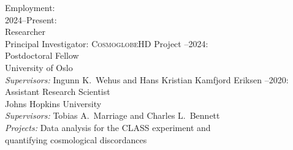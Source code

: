 \documentclass[a4paper]{resume}
\author{Duncan Joseph Watts}
\begin{document}
\maketitle




\begin{category}{Employment:}
\citemnobullet\\
2024--Present:\\
Researcher\\
Principal Investigator: \textsc{CosmoglobeHD} Project
--2024:\\
Postdoctoral Fellow\\
University of Oslo\\
\qquad \textsl{Supervisors:} Ingunn K.~Wehus and Hans Kristian Kamfjord
    Eriksen
--2020:\\
Assistant Research Scientist\\
Johns Hopkins University\\
\qquad \textsl{Supervisors:} Tobias A.~Marriage and Charles
L.~Bennett\\
\qquad \textsl{Projects:} Data analysis for the CLASS experiment and\\
\qquad {} quantifying cosmological discordances
\end{category}

\end{document}
